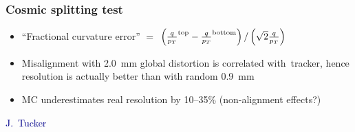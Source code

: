 \documentclass[compress]{beamer}
\begin{document}
\begin{frame}
\frametitle{Cosmic splitting test}
\begin{itemize}
\item ``Fractional curvature error'' $=$ {\scriptsize $\left(\frac{q}{p_T}^{\mbox{\scriptsize top}} - \frac{q}{p_T}^{\mbox{\scriptsize bottom}}\right)/\left(\sqrt{2}\frac{q}{p_T}\right)$}
\item Misalignment with 2.0~mm global distortion is correlated \mbox{with tracker,\hspace{-0.5 cm}} hence resolution is actually better than with random 0.9~mm
\item MC underestimates real resolution by 10--35\% {\scriptsize (non-alignment effects?)}
\end{itemize}

\hfill \textcolor{darkblue}{\scriptsize J.~Tucker}

\vspace{-0.5 cm}
\begin{center}
\mbox{\hspace{0.5 cm}}
\end{center}
\end{frame}
\end{document}

